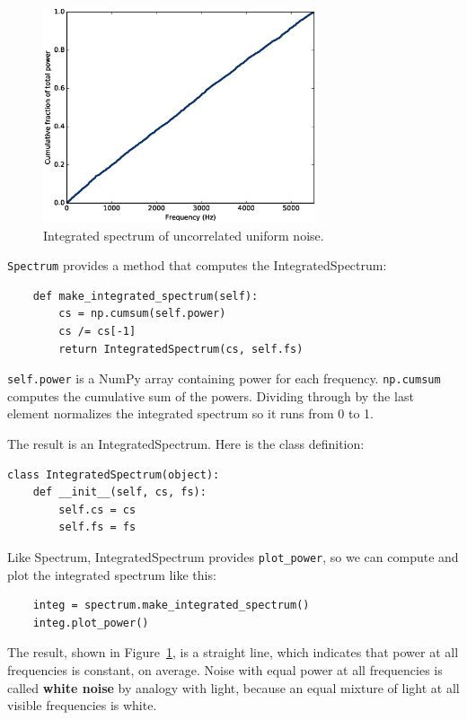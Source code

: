 \documentclass[12pt]{book}
\begin{document}
\begin{figure}
\centerline{\includegraphics[height=2.5in]{figs/whitenoise2.eps}}
\caption{Integrated spectrum of uncorrelated uniform noise.}
\label{fig.whitenoise2}
\end{figure}

{\tt Spectrum} provides a method that computes the IntegratedSpectrum:

\begin{verbatim}
    def make_integrated_spectrum(self):
        cs = np.cumsum(self.power)
        cs /= cs[-1]
        return IntegratedSpectrum(cs, self.fs)
\end{verbatim}

{\tt self.power} is a NumPy array containing power for each frequency.
{\tt np.cumsum} computes the cumulative sum of the powers.
Dividing through by the last element normalizes the integrated
spectrum so it runs from 0 to 1.

The result is an IntegratedSpectrum.  Here is the class definition:

\begin{verbatim}
class IntegratedSpectrum(object):    
    def __init__(self, cs, fs):
        self.cs = cs
        self.fs = fs
\end{verbatim}

Like Spectrum, IntegratedSpectrum provides \verb"plot_power", so
we can compute and plot the integrated spectrum like this:

\begin{verbatim}
    integ = spectrum.make_integrated_spectrum()
    integ.plot_power()
\end{verbatim}

The result, shown in Figure~\ref{fig.whitenoise2}, is a straight line,
which indicates that power at all frequencies is constant, on average.
Noise with equal power at all frequencies is called {\bf white noise}
by analogy with light, because an equal mixture of light at all
visible frequencies is white.
\end{document}

